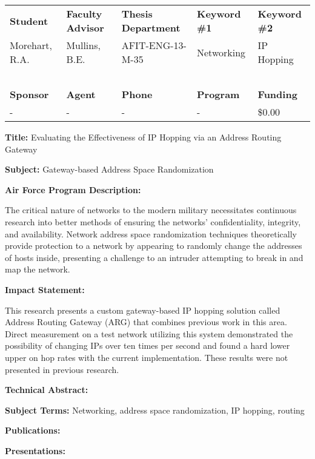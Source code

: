 \documentclass{article}
\begin{document}


\begin{tabular}{lllll}
\textbf{Student} & \textbf{Faculty Advisor} & \textbf{Thesis Department} & \textbf{Keyword \#1} & \textbf{Keyword \#2}\\
Morehart, R.A. & Mullins, B.E. & AFIT-ENG-13-M-35 & Networking & IP Hopping\\
~\\
\textbf{Sponsor} & \textbf{Agent} & \textbf{Phone} & \textbf{Program} & \textbf{Funding}\\
- & - & - & - & \$0.00\\
\end{tabular}

\begin{center}
\textbf{Title:} Evaluating the Effectiveness of IP Hopping via an Address Routing Gateway
\end{center}

\textbf{Subject:} Gateway-based Address Space Randomization

\textbf{Air Force Program Description:}

The critical nature of networks to the modern military necessitates continuous research into better methods of ensuring the networks' confidentiality, integrity, and availability. Network address space randomization techniques theoretically provide protection to a network by appearing to randomly change the addresses of hosts inside, presenting a challenge to an intruder attempting to break in and map the network. 

\textbf{Impact Statement:}

This research presents a custom gateway-based IP hopping solution called Address Routing Gateway (ARG) that combines previous work in this area. Direct measurement on a test network utilizing this system demonstrated the possibility of changing IPs over ten times per second and found a hard lower upper on hop rates with the current implementation. These results were not presented in previous research.

\textbf{Technical Abstract:}

\textbf{Subject Terms:} Networking, address space randomization, IP hopping, routing

\textbf{Publications:}

\textbf{Presentations:}
\end{document}
